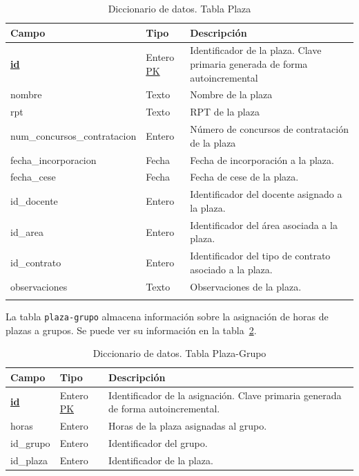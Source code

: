 \begin{table}
  \centering 
  \begin{tabular}{l p{} p{}}
    \toprule
    \textbf{Campo} & \textbf{Tipo} & \textbf{Descripción}\\
    \midrule
    \textbf{\underline{id}} & Entero \underline{PK} & Identificador de la plaza. Clave primaria generada de forma autoincremental \\ \addlinespace
    nombre & Texto & Nombre de la plaza \\ \addlinespace
    rpt & Texto & RPT de la plaza \\ \addlinespace
    num\_concursos\_contratacion & Entero & Número de concursos de contratación de la plaza \\ \addlinespace
    fecha\_incorporacion & Fecha & Fecha de incorporación a la plaza. \\ \addlinespace
    fecha\_cese & Fecha & Fecha de cese de la plaza. \\ \addlinespace
    id\_docente & Entero & Identificador del docente asignado a la plaza. \\ \addlinespace
    id\_area & Entero & Identificador del área asociada a la plaza. \\ \addlinespace
    id\_contrato & Entero & Identificador del tipo de contrato asociado a la plaza. \\ \addlinespace
    observaciones & Texto & Observaciones de la plaza. \\ \addlinespace
    \bottomrule
  \end{tabular}
  \caption{Diccionario de datos. Tabla Plaza}
  \label{tab:diccionario_plaza}
\end{table}

La tabla \texttt{plaza-grupo} almacena información sobre la asignación de horas de plazas a grupos. 
Se puede ver su información en la tabla~\ref{tab:diccionario_plaza_grupo}.

\begin{table}
  \centering 
  \begin{tabular}{l p{} p{}}
    \toprule
    \textbf{Campo} & \textbf{Tipo} & \textbf{Descripción}\\
    \midrule
    \textbf{\underline{id}} & Entero \underline{PK} & Identificador de la asignación. Clave primaria generada de forma autoincremental. \\ \addlinespace
    horas & Entero & Horas de la plaza asignadas al grupo. \\ \addlinespace
    id\_grupo & Entero & Identificador del grupo. \\ \addlinespace
    id\_plaza & Entero & Identificador de la plaza. \\ 
    \bottomrule
  \end{tabular}
  \caption{Diccionario de datos. Tabla Plaza-Grupo}
  \label{tab:diccionario_plaza_grupo}
\end{table}

